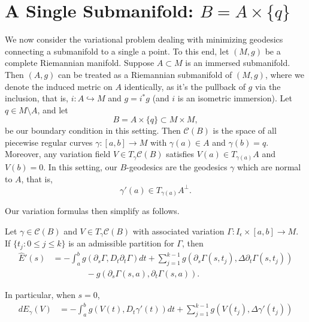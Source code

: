 


\section{A Single Submanifold: $B=A\times\{q\}$}


We now consider the variational problem dealing with minimizing geodesics connecting a submanifold to a single a point.  To this end, let $(M,g)$ be a complete Riemannian manifold.  Suppose $A\subset M$ is an immersed submanifold.  Then $(A,g)$ can be treated as a Riemannian submanifold of $(M,g)$, where we denote the induced metric on $A$ identically, as it's the pullback of $g$ via the inclusion, that is, $i:A\hookrightarrow M$ and $g=i^*g$ (and $i$ is an isometric immersion).  Let $q\in M\setminus A$, and let
$$B=A\times\{q\}\subset M\times M,$$
be our boundary condition in this setting.  Then $\mathcal{C}(B)$ is the space of all piecewise regular curves $\gamma:[a,b]\to M$ with $\gamma(a)\in A$ and $\gamma(b)=q$.  Moreover, any variation field $V\in T_\gamma\mathcal{C}(B)$ satisfies $V(a)\in T_{\gamma(a)}A$ and $V(b)=0$.  In this setting, our $B$-geodesics are the geodesics $\gamma$ which are normal to $A$, that is,
$$\gamma'(a)\in T_{\gamma(a)}A^\perp.$$

Our variation formulas then simplify as follows.

\begin{thm}
    	Let $\gamma\in\mathcal{C}(B)$ and $V\in T_\gamma\mathcal{C}(B)$ with associated variation $\Gamma:I_\epsilon\times[a,b]\to M$.  If $\{t_j:0\leq j\leq k\}$ is an admissible partition for $\Gamma$, then
    	\begin{align*}
    		\hat{E}'(s)&=-\int_a^bg(\partial_s\Gamma,D_t\partial_t\Gamma)dt+\sum_{j=1}^{k-1}g(\partial_s\Gamma(s,t_j),\Delta\partial_t\Gamma(s,t_j))\\
    		&\qquad\qquad-g(\partial_s\Gamma(s,a),\partial_t\Gamma(s,a)).
    	\end{align*}
    	
    	In particular, when $s=0$,
	\begin{align*}
		dE_\gamma(V)&=-\int_a^bg(V(t),D_t\gamma'(t))dt+\sum_{j=1}^{k-1}g(V(t_j),\Delta\gamma'(t_j))\\
  	\end{align*}
\end{thm}

